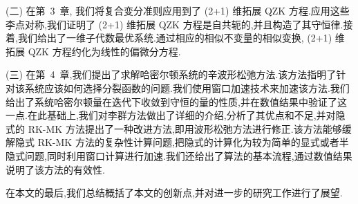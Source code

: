 (二) 在第~3~章, 我们将复合变分准则应用到了 (2+1) 维拓展 QZK 方程.应用这些李点对称,我们证明了 (2+1) 维拓展 QZK 方程是自共轭的,并且构造了其守恒律.接着,我们给出了一维子代数最优系统.通过相应的相似不变量的相似变换, (2+1) 维拓展 QZK 方程约化为线性的偏微分方程.

(三) 在第~4~章,我们提出了求解哈密尔顿系统的辛波形松弛方法.该方法指明了针对该系统应该如何选择分裂函数的问题.我们使用窗口加速技术来加速该方法.我们给出了系统哈密尔顿量在迭代下收敛到守恒的量的性质,并在数值结果中验证了这一点.在此基础上,我们对李群方法做出了详细的介绍,分析了其优点和不足,并对隐式的 RK-MK 方法提出了一种改进方法,即用波形松弛方法进行修正.该方法能够缓解隐式 RK-MK 方法的复杂性计算问题,把隐式的计算化为较为简单的显式或者半隐式问题,同时利用窗口计算进行加速.我们还给出了算法的基本流程,通过数值结果说明了该方法的有效性.

在本文的最后,我们总结概括了本文的创新点,并对进一步的研究工作进行了展望.
